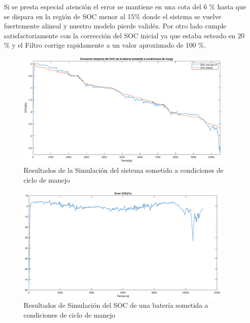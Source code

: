 \documentclass[10pt,a4paper]{article}
\begin{document}
	Si se presta especial atención el error se mantiene en una cota del 6 \% hasta que se dispara en la región de SOC menor al 15\% donde el sistema se vuelve fuertemente alineal y nuestro modelo pierde validéz. Por otro lado cumple satisfactoriamente con la corrección del SOC inicial ya que estaba seteado en 20 \% y el Filtro corrige rapidamente a un valor aproximado de 100 \%. 
	
	\begin{figure}[h!]
		\begin{center}
			\includegraphics[width=0.95\textwidth]{Drive_Cycle_1_sim.eps}
			\caption{Resultados de la Simulación del sistema sometido a condiciones de ciclo de manejo}
			\label{Drive_Cycle_1_SOC_sim}
		\end{center}
	\end{figure}
	
	\begin{figure}[h!]
		\begin{center}
			\includegraphics[width=0.95\textwidth]{soc_error_porc.eps}
			\caption{Resultados de Simulación del SOC de una batería sometida a condiciones de ciclo de manejo}
			\label{error_SOC_Sim}
		\end{center}
	\end{figure}
	
\end{document}
